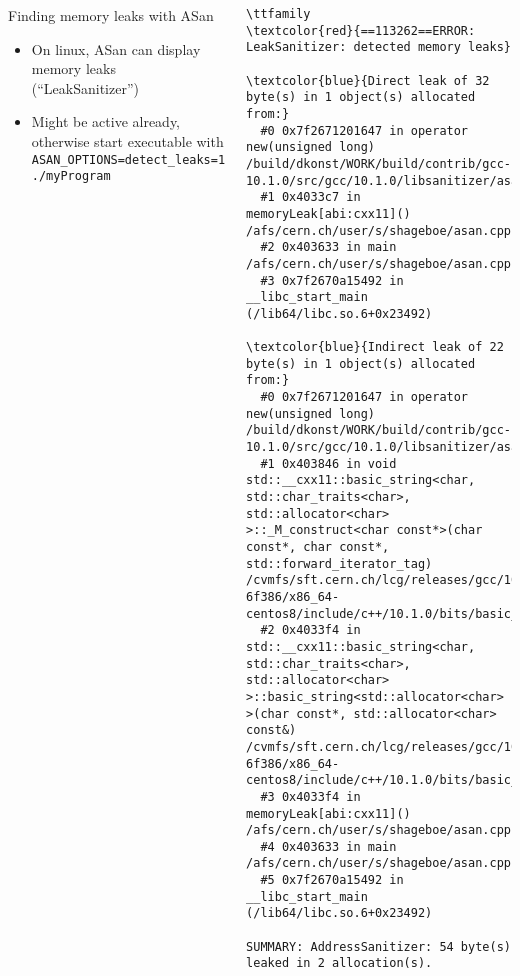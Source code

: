 \begin{frame}[fragile]
  \begin{columns}
    \column{\textwidth+1cm}
    \begin{block}{Finding memory leaks with ASan}
      \begin{itemize}
        \item On linux, ASan can display memory leaks (``LeakSanitizer'')
        \item Might be active already, otherwise start executable with \texttt{ASAN_OPTIONS=detect_leaks=1 ./myProgram}
      \end{itemize}
    \end{block}
    \scriptsize
    \begin{Verbatim}[commandchars=\\\{\}]
    \ttfamily
\textcolor{red}{==113262==ERROR: LeakSanitizer: detected memory leaks}

\textcolor{blue}{Direct leak of 32 byte(s) in 1 object(s) allocated from:}
  #0 0x7f2671201647 in operator new(unsigned long) /build/dkonst/WORK/build/contrib/gcc-10.1.0/src/gcc/10.1.0/libsanitizer/asan/asan_new_delete.cpp:99
  #1 0x4033c7 in memoryLeak[abi:cxx11]() /afs/cern.ch/user/s/shageboe/asan.cpp:33
  #2 0x403633 in main /afs/cern.ch/user/s/shageboe/asan.cpp:40
  #3 0x7f2670a15492 in __libc_start_main (/lib64/libc.so.6+0x23492)

\textcolor{blue}{Indirect leak of 22 byte(s) in 1 object(s) allocated from:}
  #0 0x7f2671201647 in operator new(unsigned long) /build/dkonst/WORK/build/contrib/gcc-10.1.0/src/gcc/10.1.0/libsanitizer/asan/asan_new_delete.cpp:99
  #1 0x403846 in void std::__cxx11::basic_string<char, std::char_traits<char>, std::allocator<char> >::_M_construct<char const*>(char const*, char const*, std::forward_iterator_tag) /cvmfs/sft.cern.ch/lcg/releases/gcc/10.1.0.c82-6f386/x86_64-centos8/include/c++/10.1.0/bits/basic_string.tcc:219
  #2 0x4033f4 in std::__cxx11::basic_string<char, std::char_traits<char>, std::allocator<char> >::basic_string<std::allocator<char> >(char const*, std::allocator<char> const&) /cvmfs/sft.cern.ch/lcg/releases/gcc/10.1.0.c82-6f386/x86_64-centos8/include/c++/10.1.0/bits/basic_string.h:247
  #3 0x4033f4 in memoryLeak[abi:cxx11]() /afs/cern.ch/user/s/shageboe/asan.cpp:33
  #4 0x403633 in main /afs/cern.ch/user/s/shageboe/asan.cpp:40
  #5 0x7f2670a15492 in __libc_start_main (/lib64/libc.so.6+0x23492)

SUMMARY: AddressSanitizer: 54 byte(s) leaked in 2 allocation(s).
    \end{Verbatim}
  \end{columns}
\end{frame}

